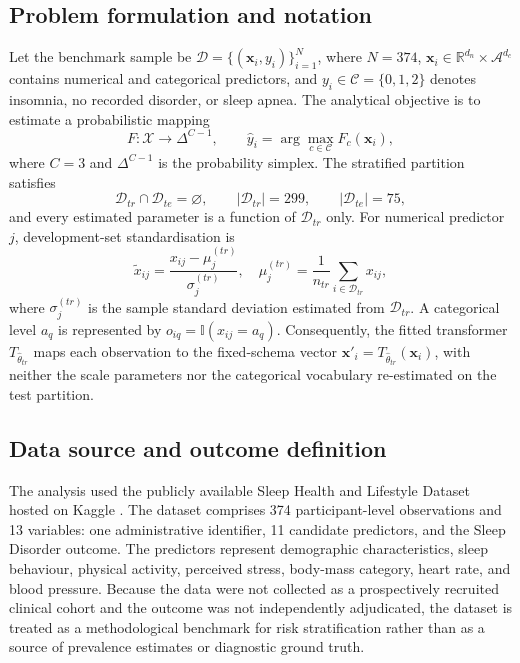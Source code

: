 \documentclass{elektr}
\begin{document}
\subsection{Problem formulation and notation}
Let the benchmark sample be $\mathcal{D}=\{(\mathbf{x}_i,y_i)\}_{i=1}^{N}$, where $N=374$, $\mathbf{x}_i\in\mathbb{R}^{d_n}\times\mathcal{A}^{d_c}$ contains numerical and categorical predictors, and $y_i\in\mathcal{C}=\{0,1,2\}$ denotes insomnia, no recorded disorder, or sleep apnea. The analytical objective is to estimate a probabilistic mapping
\begin{equation}
F:\mathcal{X}\rightarrow\Delta^{C-1},\qquad
\hat y_i=\arg\max_{c\in\mathcal{C}}F_c(\mathbf{x}_i),
\label{eq:problem}
\end{equation}
where $C=3$ and $\Delta^{C-1}$ is the probability simplex. The stratified partition satisfies
\begin{equation}
\mathcal{D}_{tr}\cap\mathcal{D}_{te}=\varnothing,
\qquad |\mathcal{D}_{tr}|=299,
\qquad |\mathcal{D}_{te}|=75,
\label{eq:partition}
\end{equation}
and every estimated parameter is a function of $\mathcal{D}_{tr}$ only. For numerical predictor $j$, development-set standardisation is
\begin{equation}
\widetilde{x}_{ij}=\frac{x_{ij}-\mu^{(tr)}_j}{\sigma^{(tr)}_j},
\quad
\mu^{(tr)}_j=\frac{1}{n_{tr}}\sum_{i\in\mathcal{D}_{tr}}x_{ij},
\label{eq:standardise}
\end{equation}
where $\sigma^{(tr)}_j$ is the sample standard deviation estimated from $\mathcal{D}_{tr}$. A categorical level $a_q$ is represented by $o_{iq}=\mathbb{I}(x_{ij}=a_q)$. Consequently, the fitted transformer $T_{\widehat{\theta}_{tr}}$ maps each observation to the fixed-schema vector $\mathbf{x}'_i=T_{\widehat{\theta}_{tr}}(\mathbf{x}_i)$, with neither the scale parameters nor the categorical vocabulary re-estimated on the test partition.

\subsection{Data source and outcome definition}
The analysis used the publicly available Sleep Health and Lifestyle Dataset hosted on Kaggle \cite{kaggle2023}. The dataset comprises 374 participant-level observations and 13 variables: one administrative identifier, 11 candidate predictors, and the Sleep Disorder outcome. The predictors represent demographic characteristics, sleep behaviour, physical activity, perceived stress, body-mass category, heart rate, and blood pressure. Because the data were not collected as a prospectively recruited clinical cohort and the outcome was not independently adjudicated, the dataset is treated as a methodological benchmark for risk stratification rather than as a source of prevalence estimates or diagnostic ground truth.
\end{document}
